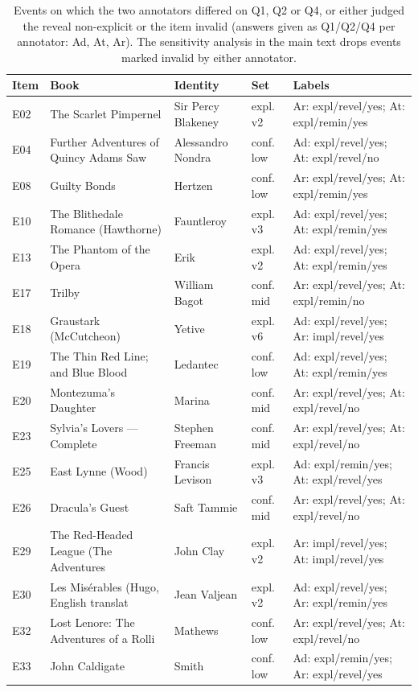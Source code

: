 \documentclass[11pt]{article}
\begin{document}
\begin{table}[!ht]
\centering
\scriptsize
\caption{Events on which the two annotators differed on Q1, Q2 or Q4, or either judged the reveal non-explicit or the item invalid (answers given as Q1/Q2/Q4 per annotator: Ad, At, Ar). The sensitivity analysis in the main text drops events marked invalid by either annotator.}\label{tab:s-human-flags}
\begin{tabular}{llllp{5.6cm}}
\toprule
Item & Book & Identity & Set & Labels \\
\midrule
E02 & The Scarlet Pimpernel & Sir Percy Blakeney & expl. v2 & Ar: expl/revel/yes; At: expl/remin/yes \\
E04 & Further Adventures of Quincy Adams Saw & Alessandro Nondra & conf. low & Ad: expl/revel/yes; At: expl/revel/no \\
E08 & Guilty Bonds & Hertzen & conf. low & Ar: expl/revel/yes; At: expl/remin/yes \\
E10 & The Blithedale Romance (Hawthorne) & Fauntleroy & expl. v3 & Ad: expl/revel/yes; At: expl/remin/yes \\
E13 & The Phantom of the Opera & Erik & expl. v2 & Ad: expl/revel/yes; At: expl/remin/yes \\
E17 & Trilby & William Bagot & conf. mid & Ar: expl/revel/yes; At: expl/remin/no \\
E18 & Graustark (McCutcheon) & Yetive & expl. v6 & Ad: expl/revel/yes; Ar: impl/revel/yes \\
E19 & The Thin Red Line; and Blue Blood & Ledantec & conf. low & Ad: expl/revel/yes; At: expl/remin/yes \\
E20 & Montezuma's Daughter & Marina & conf. mid & Ar: expl/revel/yes; At: expl/revel/no \\
E23 & Sylvia's Lovers — Complete & Stephen Freeman & conf. mid & Ar: expl/revel/yes; At: expl/revel/no \\
E25 & East Lynne (Wood) & Francis Levison & expl. v3 & Ad: expl/remin/yes; At: expl/revel/yes \\
E26 & Dracula's Guest & Saft Tammie & conf. mid & Ar: expl/revel/yes; At: expl/revel/no \\
E29 & The Red-Headed League (The Adventures  & John Clay & expl. v2 & Ar: impl/revel/yes; At: impl/revel/yes \\
E30 & Les Misérables (Hugo, English translat & Jean Valjean & expl. v2 & Ad: expl/revel/yes; Ar: expl/remin/yes \\
E32 & Lost Lenore: The Adventures of a Rolli & Mathews & conf. low & Ar: expl/revel/yes; At: expl/revel/no \\
E33 & John Caldigate & Smith & conf. low & Ad: expl/remin/yes; Ar: expl/revel/yes \\
\bottomrule
\end{tabular}
\end{table}
\end{document}
